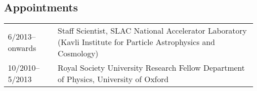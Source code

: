 \subsection*{Appointments}

\begin{tabular}{@{}p{3.5cm}p{14.8cm}}
6/2013--onwards   & Staff Scientist, SLAC National Accelerator Laboratory \newline
                    (Kavli Institute for Particle Astrophysics and Cosmology)\\
10/2010--5/2013   & Royal Society University Research Fellow\newline
                    Department of Physics, University of Oxford
\end{tabular}
